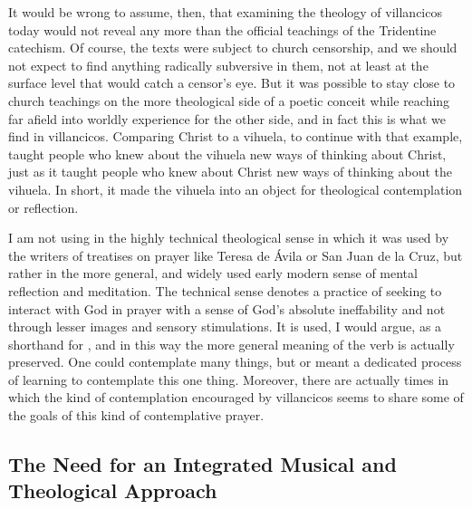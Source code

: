It would be wrong to assume, then, that examining the theology of villancicos
today would not reveal any more than the official teachings of the Tridentine
catechism.
Of course, the texts were subject to church censorship, and we should not
expect to find anything radically subversive in them, not at least at the
surface level that would catch a censor's eye.
But it was possible to stay close to church teachings on the more theological
side of a poetic conceit while reaching far afield into worldly experience for
the other side, and in fact this is what we find in villancicos.
Comparing Christ to a vihuela, to continue with that example, taught people who
knew about the vihuela new ways of thinking about Christ, just as it taught
people who knew about Christ new ways of thinking about the vihuela.
In short, it made the vihuela into an object for theological contemplation or
reflection.%
\begin{Footnote}
    I am not using  in the highly technical theological
    sense in which it was used by the writers of treatises on prayer like
    Teresa de Ávila or San Juan de la Cruz, but rather in the more general, and
    widely used early modern sense of mental reflection and meditation.
    The technical sense denotes a practice of seeking to interact with God in
    prayer with a sense of God's absolute ineffability and not through lesser
    images and sensory stimulations. 
    It is used, I would argue, as a shorthand for , and in this way the more general meaning of the verb is
    actually preserved.
    One could contemplate many things, but  or
     meant a dedicated process of learning to
    contemplate this one thing.
    Moreover, there are actually times in which the kind of contemplation
    encouraged by villancicos seems to share some of the goals of this kind of
    contemplative prayer.
\end{Footnote}

\subsection{The Need for an Integrated Musical and Theological Approach}


